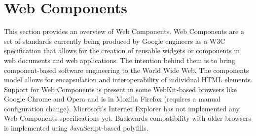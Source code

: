 \section{Web Components}
\label{sec:web_components}
This section provides an overview of Web  Components.
Web Components are a set of standards currently being produced by Google engineers as a W3C specification that allows for the creation of reusable widgets or components in web documents and web  applications.  The intention behind them is to bring component-based software engineering to the World Wide Web. The components model allows for encapsulation and interoperability of individual HTML  elements.
\newline
Support for Web Components is present in some WebKit-based browsers like Google Chrome and Opera and is in Mozilla Firefox (requires a manual configuration change). Microsoft’s Internet Explorer has not implemented any Web Components specifications yet. Backwards compatibility with older browsers is implemented using JavaScript-based polyfills.\cite{tch_webcomp}

